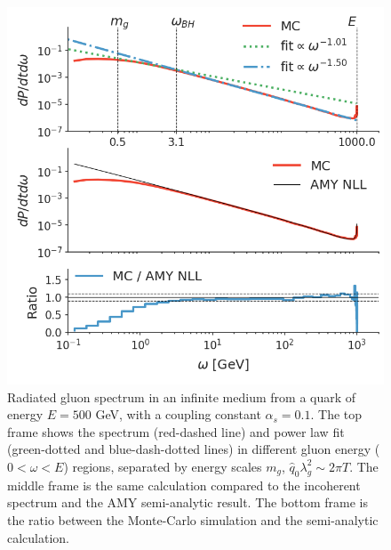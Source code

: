 \documentclass[aps, prc, reprint, amsmath, groupedaddress, nofootinbib]{revtex4-1}
\begin{document}
\begin{figure}
\includegraphics[width=\columnwidth]{spectrum.png}
\caption{Radiated gluon spectrum in an infinite medium from a quark of energy $E=500$ GeV, with a coupling constant $\alpha_s = 0.1$. The top frame shows the spectrum (red-dashed line) and power law fit (green-dotted and blue-dash-dotted lines) in different gluon energy ($0<\omega < E$) regions, separated by energy scales $m_g$, $\hat{q}_0\lambda_g^2 \sim 2\pi T$. The middle frame is the same calculation compared to the incoherent spectrum and the AMY semi-analytic result. The bottom frame is the ratio between the Monte-Carlo simulation and the semi-analytic calculation.}
\label{fig:spectrum}
\end{figure}
\end{document}
